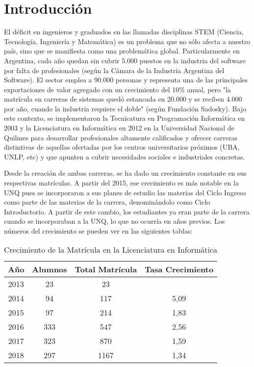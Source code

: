 \chapter{Introducción}
\label{sec:introduccion}


El déficit en ingenieros y graduados en las llamadas disciplinas STEM (Ciencia, Tecnología, Ingeniería y Matemática) es un problema que no sólo afecta a nuestro país, sino que se manifiesta como una problemática global. Particularmente en Argentina, cada año quedan sin cubrir 5.000 puestos en la industria del software por falta de profesionales (según la Cámara de la Industria Argentina del Software). El sector emplea a 90.000 personas y representa una de las principales exportaciones de valor agregado con un crecimiento del 10\% anual, pero "la matrícula en carreras de sistemas quedó estancada en 20.000 y se reciben 4.000 por año, cuando la industria requiere el doble" (según Fundación Sadosky).
Bajo este contexto, se implementaron la Tecnicatura en Programación Informática en 2003 y la Licenciatura en Informática en 2012 en la Universidad Nacional de Quilmes para desarrollar profesionales altamente calificados y ofrecer carreras distintivas de aquellas ofertadas por los centros universitarios próximos (UBA, UNLP, etc) y que apunten a cubrir necesidades sociales e industriales concretas.
 
Desde la creación de ambas carreras, se ha dado un crecimiento constante  en sus respectivas matrículas. A partir del 2015, ese crecimiento es más notable en la UNQ pues se incorporaron a sus planes de estudio las materias del Ciclo Ingreso como parte de las materias de la carrera, denominándolo como Ciclo Introductorio. A partir de este cambio, los estudiantes ya eran parte de la carrera cuando se incorporaban a la UNQ, lo que no ocurría en años previos. Los números del crecimiento se pueden ver en las siguientes tablas:


\begin{table}[!htbp]
    \centering
    \begin{tabular}{|c|c|c|c|}
    \hline
    Año & Alumnos & Total Matrícula & Tasa Crecimiento \\
    \hline
    2013 & 23 & 23 & \\
    \hline
    2014 & 94 & 117 & 5,09 \\ 
    \hline
    2015 & 97 & 214 & 1,83 \\
    \hline
    2016 & 333 & 547 & 2,56 \\
    \hline
    2017 & 323 & 870 & 1,59 \\ 
    \hline
    2018 & 297 & 1167 & 1,34 \\ 
    \hline
    \end{tabular}
    \caption{Crecimiento de la Matrícula en la Licenciatura en Informática}
    \label{tab:tabla_planes}
\end{table}



